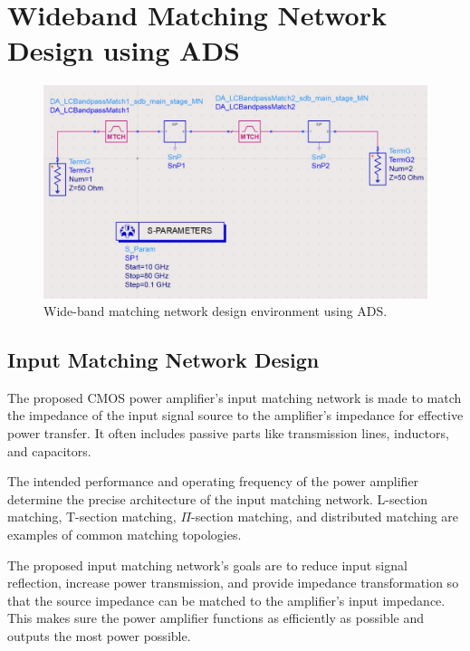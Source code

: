 \section{Wideband Matching Network Design using ADS}
 \begin{figure}
     \centering
     \includegraphics[scale=0.5]{figures/matching-ADS.jpeg}
     \caption{Wide-band matching network design environment using ADS.}
     \label{fig:matching-network-ads}
 \end{figure}
 
\subsection{Input Matching Network Design}
 The proposed CMOS power amplifier's input matching network is made to match the impedance of the input signal source to the amplifier's impedance for effective power transfer. It often includes passive parts like transmission lines, inductors, and capacitors.

The intended performance and operating frequency of the power amplifier determine the precise architecture of the input matching network. L-section matching, T-section matching, $\Pi$-section matching, and distributed matching are examples of common matching topologies.

The proposed input matching network's goals are to reduce input signal reflection, increase power transmission, and provide impedance transformation so that the source impedance can be matched to the amplifier's input impedance. This makes sure the power amplifier functions as efficiently as possible and outputs the most power possible.

